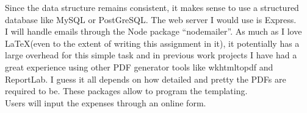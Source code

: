\documentclass{homework}
\begin{document}
\begin{solution}
    Since the data structure remains consistent, it makes sense to use a structured database like MySQL or PostGreSQL. The web server I would use is Express.\\

    I will handle emails through the Node package ``nodemailer''. As much as I love \LaTeX (even to the extent of writing this assignment in it), it potentially has a large overhead for this simple task and in previous work projects I have had a great experience using other PDF generator tools like wkhtmltopdf and ReportLab. I guess it all depends on how detailed and pretty the PDFs are required to be. These packages allow to program the templating. \\

    Users will input the expenses through an online form. 

\end{solution}
\end{document}
